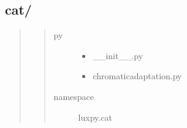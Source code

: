 \documentclass[letterpaper,10pt,english]{sphinxmanual}
\begin{document}
\subsection{cat/}
\label{\detokenize{color:cat}}\begin{quote}
\begin{quote}\begin{description}
\item[{py}] \leavevmode\begin{itemize}
\item {} 
\_\_init\_\_.py

\item {} 
chromaticadaptation.py

\end{itemize}

\item[{namespace}] \leavevmode
luxpy.cat

\end{description}\end{quote}
\end{quote}
\label{\detokenize{color:module-luxpy.color.cat}}
\end{document}
